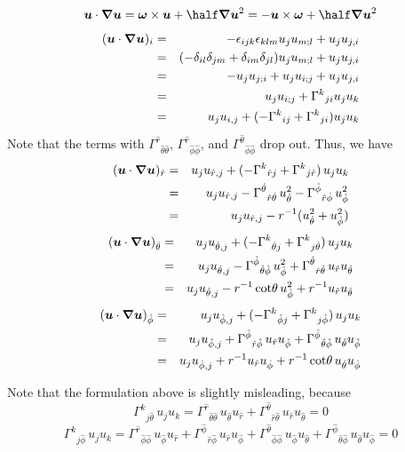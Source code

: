 \documentclass[\mydriver,12pt,twoside,notitlepage,a4paper]{article}
\renewcommand{\vec}[1]{\mbox{\boldmath{$#1$}}}
\newcommand{\uv}            {\vec{u}}
\newcommand{\omv}           {\boldsymbol{\omega}}
\newcommand{\nab}{\mbox{\boldmath $\nabla$} {}}
\begin{document}
\begin{equation}
\uv\cdot\nab\uv=\omv\times\uv+\half\nab\uv^2=-\uv\times\omv+\half\nab\uv^2
\end{equation}
\begin{eqnarray}
(\uv\cdot\nab\uv)_i
&=&-\epsilon_{ijk}\epsilon_{klm}u_ju_{m;l}+u_ju_{j,i}
\cr
&=&(-\delta_{il}\delta_{jm}+\delta_{im}\delta_{jl})u_ju_{m;l}+u_ju_{j,i}
\cr
&=&-u_ju_{j;i}+u_ju_{i;j}+u_ju_{j,i}
\cr
&=&u_ju_{i;j}+{\Gamma^k}_{ji}u_ju_{k}
\cr
&=&u_ju_{i,j}+(-{\Gamma^k}_{ij}+{\Gamma^k}_{ji})u_ju_{k}
\end{eqnarray}
Note that the terms with
${\Gamma^{\hat r}}_{{\hat\theta}{\hat\theta}}$,
${\Gamma^{\hat r}}_{{\hat\phi}{\hat\phi}}$, and
${\Gamma^{\hat\theta}}_{{\hat\phi}{\hat\phi}}$ drop out.
Thus, we have
\begin{eqnarray}
(\uv\cdot\nab\uv)_{\hat r}
&=&u_ju_{\hat r,j}+(-{\Gamma^k}_{\hat rj}+{\Gamma^k}_{j\hat r})\,u_ju_{k}
\cr
&=&u_ju_{\hat r,j}-{\Gamma^{\hat\theta}}_{\hat r\hat\theta}\,u_{\hat\theta}^2-{\Gamma^{\hat\phi}}_{\hat r\hat\phi}\,u_{\hat\phi}^2
\cr
&=&u_ju_{\hat r,j}-r^{-1}(u_{\hat\theta}^2+u_{\hat\phi}^2)
\end{eqnarray}
\begin{eqnarray}
(\uv\cdot\nab\uv)_{\hat\theta}
&=&u_ju_{\hat\theta,j}+(-{\Gamma^k}_{\hat\theta j}+{\Gamma^k}_{j\hat\theta})\,u_ju_{k}
\cr
&=&u_ju_{\hat\theta,j}-{\Gamma^{\hat\phi}}_{\hat\theta\hat\phi}\,u_{\hat\phi}^2+{\Gamma^{\hat\theta}}_{\hat r\hat\theta}\,u_{\hat r}u_{\hat\theta}
\cr
&=&u_ju_{\hat\theta,j}-r^{-1}\cot\!\theta\,u_{\hat\phi}^2+r^{-1}u_{\hat r}u_{\hat\theta}
\end{eqnarray}
\begin{eqnarray}
(\uv\cdot\nab\uv)_{\hat\phi}
&=&u_ju_{\hat\phi,j}+(-{\Gamma^k}_{\hat\phi j}+{\Gamma^k}_{j\hat\phi})\,u_ju_{k}
\cr
&=&u_ju_{\hat\phi,j}+{\Gamma^{\hat\phi}}_{\hat r\hat\phi}\,u_{\hat r}u_{\hat\phi}+{\Gamma^{\hat\phi}}_{\hat\theta\hat\phi}\,u_{\hat\theta}u_{\hat\phi}
\cr
&=&u_ju_{\hat\phi,j}+r^{-1}u_{\hat r}u_{\hat\phi}+r^{-1}\cot\!\theta\,u_{\hat\theta}u_{\hat\phi}
\end{eqnarray}

Note that the formulation above is slightly misleading, because
\begin{equation}
{\Gamma^k}_{j\hat\theta}\,u_ju_{k}
={\Gamma^{\hat r}}_{\hat\theta\hat\theta}\,u_{\hat\theta}u_{\hat r}
+{\Gamma^{\hat\theta}}_{\hat r\hat\theta}\,u_{\hat r}u_{\hat\theta}
=0
\end{equation}
\begin{equation}
{\Gamma^k}_{j\hat\phi}\,u_ju_{k}
={\Gamma^{\hat r}}_{\hat\phi\hat\phi}\,u_{\hat\phi}u_{\hat r}
+{\Gamma^{\hat\phi}}_{\hat r\hat\phi}\,u_{\hat r}u_{\hat\phi}
+{\Gamma^{\hat\theta}}_{\hat\phi\hat\phi}\,u_{\hat\phi}u_{\hat\theta}
+{\Gamma^{\hat\phi}}_{\hat\theta\hat\phi}\,u_{\hat\theta}u_{\hat\phi}
=0
\end{equation}
\end{document}
